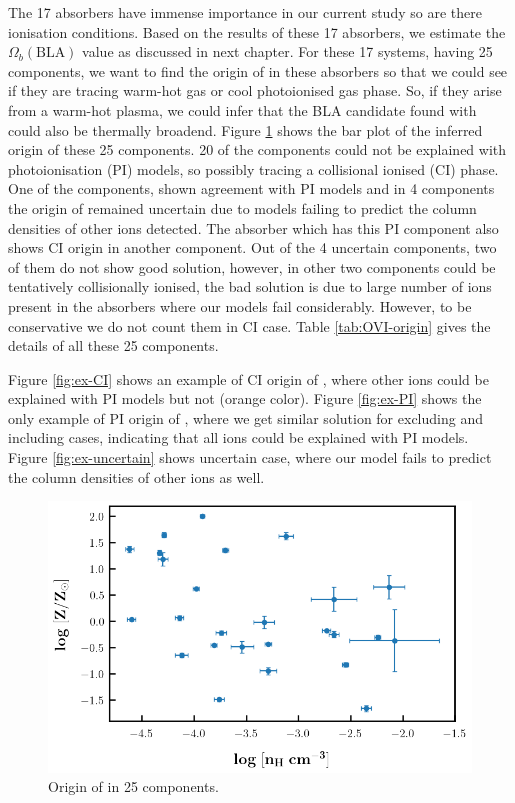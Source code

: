 The 17  absorbers have immense importance in our current study so are there ionisation conditions. Based on the results of these 17 absorbers, we estimate the $\Omega_b(\text{BLA})$ value as discussed in next chapter. For these 17 systems, having 25 components, we want to find the origin of  in these absorbers so that we could see if they are tracing warm-hot gas or cool photoionised gas phase. So, if they arise from a warm-hot plasma, we could infer that the BLA candidate found with  could also be thermally broadend. Figure \ref{fig:OVI-origin} shows the bar plot of the inferred origin of these 25 components. 20 of the components could not be explained with photoionisation (PI) models, so possibly tracing a collisional ionised (CI) phase. One of the components, shown agreement with PI models and in 4 components the origin of  remained uncertain due to models failing to predict the column densities of other ions detected. The absorber which has this PI component also shows CI origin in another component. Out of the 4 uncertain components, two of them do not show good solution, however, in other two components  could be tentatively collisionally ionised, the bad solution is due to large number of ions present in the absorbers where our models fail considerably. However, to be conservative we do not count them in CI case. Table \ref{tab:OVI-origin} gives the details of all these 25 components.

Figure \ref{fig:ex-CI} shows an example of CI origin of , where other ions could be explained with PI models but not  (orange color). Figure \ref{fig:ex-PI} shows the only example of PI origin of , where we get similar solution for excluding and including  cases, indicating that all ions could be explained with PI models. Figure \ref{fig:ex-uncertain} shows uncertain case, where our model fails to predict the column densities of other ions as well. 


\begin{figure}
    \centering
    \includegraphics[width=\linewidth]{Figures/Z_vs_nH.png}
    \caption{Origin of  in 25 components.}
    \label{fig:OVI-origin}
\end{figure}


